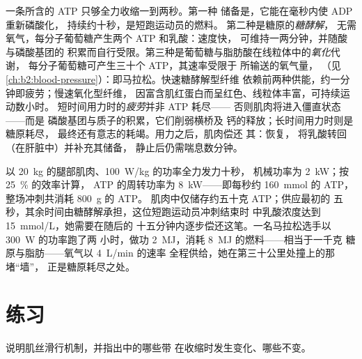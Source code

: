 \begin{proposition}[做功的供能]\label{prop:b2:muscle-movement:energy}
一条所含的 ATP 只够全力收缩一到两秒。第一种
储备是\emph{}，它能在毫秒内使 ADP 重新磷酸化，
持续约十秒，是短跑运动员的燃料。
第二种是糖原的\emph{糖酵解}，
无需氧气，每分子葡萄糖产生两个 ATP 和乳酸：速度快，
可维持一两分钟，并随酸与磷酸基团的
积累而自行受限。第三种是葡萄糖与脂肪酸在线粒体中的\emph{氧化}代谢，
每分子葡萄糖可产生三十个 ATP，其速率受限于
所输送的氧气量，
（见\cref{ch:b2:blood-pressure}）：即马拉松。快速糖酵解型纤维
依赖前两种供能，约一分钟即疲劳；慢速氧化型纤维，
因富含肌红蛋白而呈红色、线粒体丰富，可持续运动数小时。
短时间用力时的\emph{疲劳}并非 ATP 耗尽——
否则肌肉将进入僵直状态——而是
磷酸基团与质子的积累，它们削弱横桥及
钙的释放；长时间用力时则是糖原耗尽，
最终还有意志的耗竭。用力之后，肌肉偿还
其\emph{}：恢复，
将乳酸转回（在肝脏中）并补充其储备，
静止后仍需喘息数分钟。
\end{proposition}

\begin{example}[一百米]\label{ex:b2:muscle-movement:sprint}
以 \qty{20}{kg} 的腿部肌肉、\qty{100}{W/kg} 的功率全力发力十秒，
机械功率为 \qty{2}{kW}；按 \qty{25}{\%} 的效率计算，
ATP 的周转功率为 \qty{8}{kW}——即每秒约 \qty{160}{mmol} 的 ATP，
整场冲刺共消耗 \qty{800}{g} 的 ATP。
肌肉中仅储存约五十克 ATP；供应最初的
五秒，其余时间由糖酵解承担，这位短跑运动员冲刺结束时
中乳酸浓度达到 \qty{15}{mmol/L}，她需要在随后的
十五分钟内逐步偿还这笔。一名马拉松选手以 \qty{300}{W} 的功率跑了两
小时，做功 \qty{2}{MJ}，消耗 \qty{8}{MJ} 的燃料——相当于一千克
糖原与脂肪——氧气以 \qty{4}{L/min} 的速率
全程供给，她在第三十公里处撞上的那堵“墙”，
正是糖原耗尽之处。
\end{example}

\section{练习}

\begin{exercise}[$\star$]\label{exo:b2:muscle-movement:1}
说明肌丝滑行机制，并指出中的哪些带
在收缩时发生变化、哪些不变。
\end{exercise}

